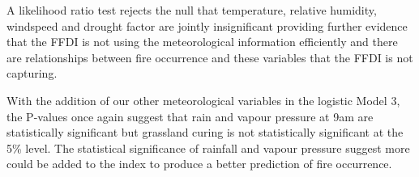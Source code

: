 \documentclass[11pt,a4paper]{article}
\begin{document}
A likelihood ratio test rejects the null that temperature, relative humidity, windspeed and drought factor are jointly insignificant providing further evidence that the FFDI is not using the meteorological information efficiently and there are relationships between fire occurrence and these variables that the FFDI is not capturing.


With the addition of our other meteorological variables in the logistic Model 3, the P-values once again suggest that rain and vapour pressure at 9am are statistically significant but grassland curing is not statistically significant at the 5\% level. The statistical significance of rainfall and vapour pressure suggest more could be added to the index to produce a better prediction of fire occurrence. 
\end{document}
